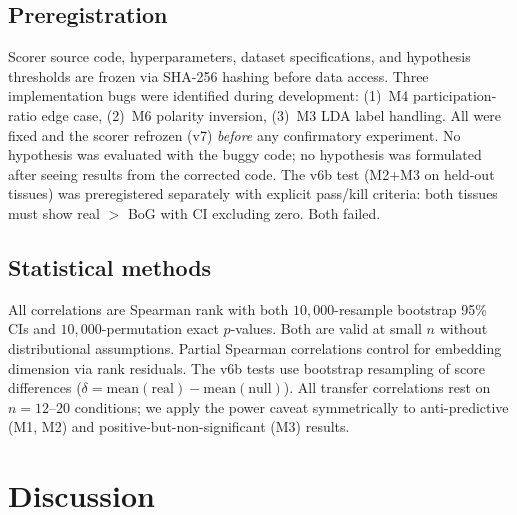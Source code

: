 \documentclass[9pt,lineno]{elife}
\begin{document}
\subsection{Preregistration}

Scorer source code, hyperparameters, dataset specifications, and hypothesis thresholds are frozen via SHA-256 hashing before data access. Three implementation bugs were identified during development: (1)~M4 participation-ratio edge case, (2)~M6 polarity inversion, (3)~M3 LDA label handling. All were fixed and the scorer refrozen (v7) \emph{before} any confirmatory experiment. No hypothesis was evaluated with the buggy code; no hypothesis was formulated after seeing results from the corrected code. The v6b test (M2+M3 on held-out tissues) was preregistered separately with explicit pass/kill criteria: both tissues must show real $>$ BoG with CI excluding zero. Both failed.

\subsection{Statistical methods}

All correlations are Spearman rank with both $10{,}000$-resample bootstrap 95\% CIs and $10{,}000$-permutation exact $p$-values. Both are valid at small $n$ without distributional assumptions. Partial Spearman correlations control for embedding dimension via rank residuals. The v6b tests use bootstrap resampling of score differences ($\delta = \text{mean}(\text{real}) - \text{mean}(\text{null})$). All transfer correlations rest on $n = 12$--$20$ conditions; we apply the power caveat symmetrically to anti-predictive (M1, M2) and positive-but-non-significant (M3) results.


\section{Discussion}
\end{document}
